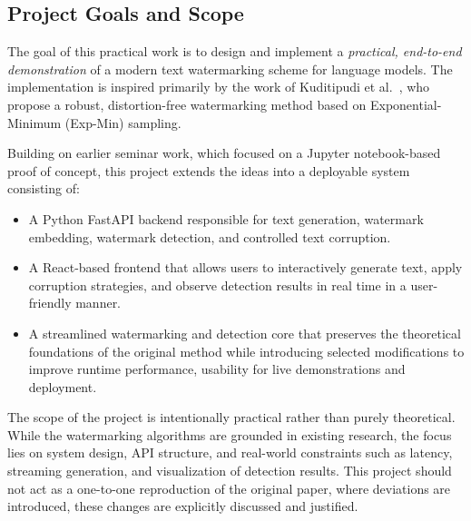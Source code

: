 \subsection{Project Goals and Scope}

The goal of this practical work is to design and implement a \emph{practical, end-to-end demonstration} of a modern text watermarking scheme for language models. The implementation is inspired primarily by the work of Kuditipudi et al.~\cite{kuditipudi2023robustarticle}, who propose a robust, distortion-free watermarking method based on Exponential-Minimum (Exp-Min) sampling.

Building on earlier seminar work, which focused on a Jupyter notebook-based proof of concept, this project extends the ideas into a deployable system consisting of:
\begin{itemize}
    \item A Python FastAPI backend responsible for text generation, watermark embedding, watermark detection, and controlled text corruption.
    \item A React-based frontend that allows users to interactively generate text, apply corruption strategies, and observe detection results in real time in a user-friendly manner.
    \item A streamlined watermarking and detection core that preserves the theoretical foundations of the original method while introducing selected modifications to improve runtime performance, usability for live demonstrations and deployment.
\end{itemize}

The scope of the project is intentionally practical rather than purely theoretical. While the watermarking algorithms are grounded in existing research, the focus lies on system design, API structure, and real-world constraints such as latency, streaming generation, and visualization of detection results. This project should not act as a one-to-one reproduction of the original paper, where deviations are introduced, these changes are explicitly discussed and justified.



